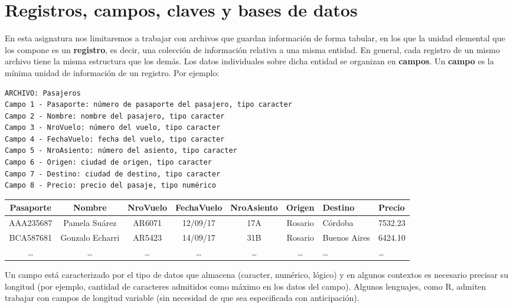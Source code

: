 \documentclass[
]{book}
\begin{document}
\hypertarget{registros-campos-claves-y-bases-de-datos}{%
\section{Registros, campos, claves y bases de datos}\label{registros-campos-claves-y-bases-de-datos}}

En esta asignatura nos limitaremos a trabajar con archivos que guardan información de forma tabular, en los que la unidad elemental que los compone es un \textbf{registro}, es decir, una colección de información relativa a una misma entidad. En general, cada registro de un mismo archivo tiene la misma estructura que los demás. Los datos individuales sobre dicha entidad se organizan en \textbf{campos}. Un \textbf{campo} es la mínima unidad de información de un registro. Por ejemplo:

\begin{verbatim}
ARCHIVO: Pasajeros
Campo 1 - Pasaporte: número de pasaporte del pasajero, tipo caracter
Campo 2 - Nombre: nombre del pasajero, tipo caracter
Campo 3 - NroVuelo: número del vuelo, tipo caracter
Campo 4 - FechaVuelo: fecha del vuelo, tipo caracter
Campo 5 - NroAsiento: número del asiento, tipo caracter
Campo 6 - Origen: ciudad de origen, tipo caracter
Campo 7 - Destino: ciudad de destino, tipo caracter
Campo 8 - Precio: precio del pasaje, tipo numérico
\end{verbatim}

\begin{longtable}[]{@{}ccccccll@{}}
\toprule
Pasaporte & Nombre & NroVuelo & FechaVuelo & NroAsiento & Origen & Destino & Precio \\
\midrule
\endhead
AAA235687 & Pamela Suárez & AR6071 & 12/09/17 & 17A & Rosario & Córdoba & 7532.23 \\
BCA587681 & Gonzalo Echarri & AR5423 & 14/09/17 & 31B & Rosario & Buenos Aires & 6424.10 \\
\ldots{} & \ldots{} & \ldots{} & \ldots{} & \ldots{} & \ldots{} & \ldots{} & \ldots{} \\
\bottomrule
\end{longtable}

Un campo está caracterizado por el tipo de datos que almacena (caracter, numérico, lógico) y en algunos contextos es necesario precisar su longitud (por ejemplo, cantidad de caracteres admitidos como máximo en los datos del campo). Algunos lenguajes, como R, admiten trabajar con campos de longitud variable (sin necesidad de que sea especificada con anticipación).
\end{document}
